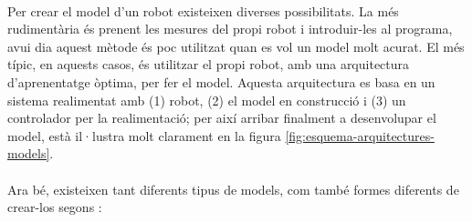 \documentclass[12pt,a4paper,final,twoside]{article}
\begin{document}
\paragraph{}Per crear el model d'un robot existeixen diverses possibilitats. La més rudimentària és prenent les mesures del propi robot i introduir-les al programa, avui dia aquest mètode és poc utilitzat quan es vol un model molt acurat. El més típic, en aquests casos, és utilitzar el propi robot, amb una arquitectura d'aprenentatge òptima, per fer el model. Aquesta arquitectura es basa en un sistema realimentat amb (1) robot, (2) el model en construcció i (3) un controlador per la realimentació; per així arribar finalment a desenvolupar el model,  està il·lustra molt clarament en la figura \ref{fig:esquema-arquitectures-models}.

\paragraph{}Ara bé, existeixen tant diferents tipus de models, com també formes diferents de crear-los segons \cite{Nguyen-Tuong2011}:
\end{document}
